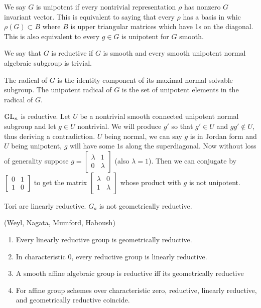 \documentclass[12pt]{article}
\begin{document}
\begin{definition}
    We say $G$ is unipotent if every nontrivial representation $\rho$ has nonzero $G$ invariant vector. This is equivalent to saying that every $\rho$ has a basis in whic $\rho(G)\subset B$ where $B$ is upper triangular matrices which have 1s on the diagonal. This is also equivalent to every $g\in G$ is unipotent for $G$ smooth.

    \hfill

    We say that $G$ is reductive if $G$ is smooth and every smooth unipotent normal algebraic subgroup is trivial.
\end{definition}
\begin{definition} The radical of $G$ is the identity component of its maximal normal solvable subgroup. The unipotent radical of $G$ is the set of unipotent elements in the radical of $G$. 
\end{definition}
\begin{example}
    $\operatorname{GL}_n$ is reductive. Let $U$ be a nontrivial smooth connected unipotent normal subgroup and let $g\in U$ nontrivial. We will produce $g'$ so that $g'\in U$ and $gg'\not\in U$, thus deriving a contradiction. $U$ being normal, we can say $g$ is in Jordan form and $U$ being unipotent, $g$ will have some $1$s along the superdiagonal. Now without loss of generality suppose $g = \begin{bmatrix}
        \lambda & 1\\
        0 & \lambda
    \end{bmatrix}$ (also $\lambda = 1$). Then we can conjugate by $\begin{bmatrix}
        0 & 1\\
        1 & 0 
    \end{bmatrix}$ to get the matrix $\begin{bmatrix}
        \lambda & 0\\
        1 & \lambda
    \end{bmatrix}$ whose product with $g$ is not unipotent.
\end{example}
\begin{example}
    Tori are linearly reductive. $G_a$ is not geometrically reductive.
\end{example}
\begin{theorem}
    (Weyl, Nagata, Mumford, Haboush)
    \begin{enumerate}
        \item Every linearly reductive group is geometrically reductive.
        \item In characteristic 0, every reductive group is linearly reductive.
        \item A smooth affine algebraic group is reductive iff its geometrically reductive
        \item For affine group schemes over characteristic zero, reductive, linearly reductive, and geometrically reductive coincide.
    \end{enumerate}
\end{theorem}
\end{document}

